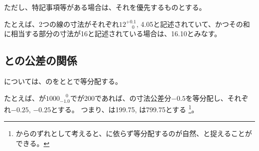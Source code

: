 ただし、特記事項等がある場合は、それを優先するものとする。
\begin{hosoku}
たとえば、2つの線の寸法がそれぞれ$12^{+0.1}_{\phantom -0}$, 4.05と記述されていて、かつその和に相当する部分の寸法が16と記述されている場合は、16.10とみなす。
\end{hosoku}



\clearpage


\subsection{\indexWorkTotalLengthTolerance\indexAlocationLengthTolerance\nameWorkTotalLength と\nameAlocationLength の公差の関係}
\AlocationLengthTolerance については、\WorkTotalLength の\WorkTotalLengthTolerance を\TopAlocationLength と\BottomAlocationLength とで等分配する。
\begin{hosoku}
たとえば、\WorkTotalLength が$1000^{\phantom +0}_{-1.0}$で\TopAlocationLength が200であれば、\WorkTotalLength の寸法公差分$-0.5$を等分配し、それぞれ$-0.25$, $-0.25$とする。
つまり、\TopAlocationLength は199.75, \BottomAlocationLength は799.75とする
\footnote{\nameAlocationCenter からのずれとして考えると、\AlocationLength に依らず等分配するのが自然、と捉えることができる。}。
\end{hosoku}


